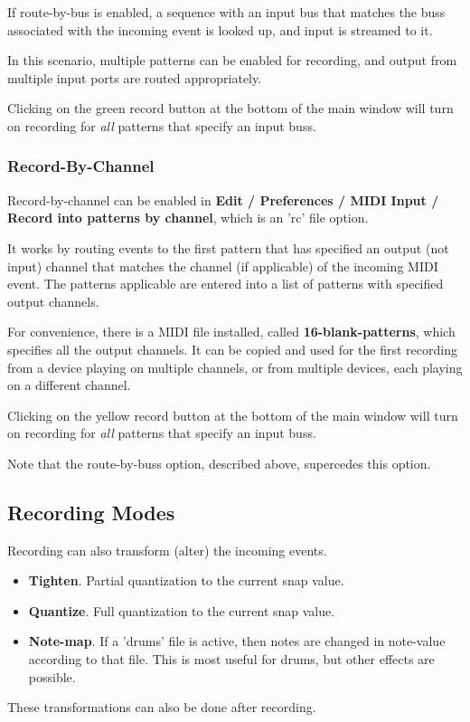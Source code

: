    If route-by-bus is enabled, a sequence with an input bus that matches the
   buss associated with the incoming event is looked up, and input is
   streamed to it.

   In this scenario, multiple patterns can be enabled for recording,
   and output from multiple input ports are routed appropriately.

   Clicking on the green record button at the bottom of the main window
   will turn on recording for \textsl{all}
   patterns that specify an input buss.

\subsubsection{Record-By-Channel}
\label{subsubsec:recording_record_by_channel}

   Record-by-channel can be enabled in
   \textbf{Edit / Preferences / MIDI Input / Record into patterns by
   channel}, which is an 'rc' file option.

   It works by routing events to the first pattern that has specified an 
   output (not input) channel that matches the channel (if applicable) of
   the incoming MIDI event.
   The patterns applicable are entered into a list of patterns with specified
   output channels.

   For convenience, there is a MIDI file installed, called
   \textbf{16-blank-patterns}, which specifies all the output channels.
   It can be copied and used for the first recording from a device
   playing on multiple channels, or from multiple devices, each playing
   on a different channel.

   Clicking on the yellow record button at the bottom of the main window
   will turn on recording for \textsl{all}
   patterns that specify an input buss.

   Note that the route-by-buss option, described above, supercedes this
   option.

\subsection{Recording Modes}
\label{sec:recording_modes}

   Recording can also transform (alter) the incoming events.

   \begin{itemize}
      \item \textbf{Tighten}.
         Partial quantization to the current snap value.
      \item \textbf{Quantize}.
         Full quantization to the current snap value.
      \item \textbf{Note-map}.
         If a 'drums' file is active, then notes are changed
         in note-value according to that file.
         This is most useful for drums, but other effects are possible.
   \end{itemize}

   These transformations can also be done after recording.

